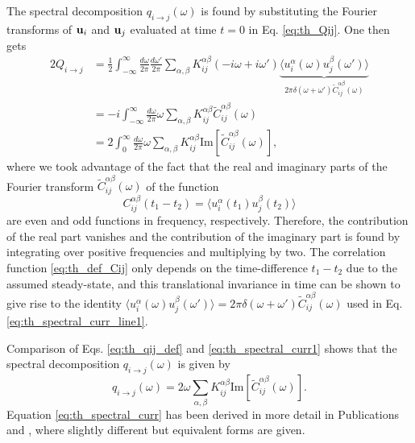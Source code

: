 The spectral decomposition $q_{i\to j}(\omega)$ is found by substituting the Fourier transforms of $\mathbf{u}_i$ and $\mathbf{u}_j$ evaluated at time $t=0$ in Eq. \eqref{eq:th_Qij}. One then gets
\begin{alignat}{2}
 Q_{i\to j} &= \frac{1}{2} \int_{-\infty}^{\infty} \frac{d\omega}{2\pi} \frac{d\omega'}{2\pi} \sum_{\alpha,\beta} K_{ij}^{\alpha\beta} (-i\omega+i\omega') \underbrace{\langle u_i^{\alpha}(\omega) u_j^{\beta}(\omega') \rangle}_{2\pi \delta(\omega+\omega')\tilde C_{ij}^{\alpha\beta}(\omega)} \label{eq:th_spectral_curr_line1} \\
  &= -i   \int_{-\infty}^{\infty} \frac{d\omega}{2\pi} \omega \sum_{\alpha,\beta} K_{ij}^{\alpha\beta} \tilde C_{ij}^{\alpha\beta}(\omega) \label{eq:th_spectral_curr_line2} \\
  &=  2 \int_{0}^{\infty}\frac{d\omega}{2\pi} \omega \sum_{\alpha,\beta} K_{ij}^{\alpha\beta} \textrm{Im}[\tilde C_{ij}^{\alpha\beta}(\omega)], \label{eq:th_spectral_curr1}
\end{alignat}
where we took advantage of the fact that the real and imaginary parts of the Fourier transform $\tilde{C}_{ij}^{\alpha\beta}(\omega)$ of the function
\begin{equation}
 C_{ij}^{\alpha\beta}(t_1-t_2) = \langle u_i^{\alpha}(t_1)u_j^{\beta}(t_2) \rangle \label{eq:th_def_Cij} 
\end{equation}
are even and odd functions in frequency, respectively. Therefore, the contribution of the real part vanishes and the contribution of the imaginary part is found by integrating over positive frequencies and multiplying by two. The correlation function \eqref{eq:th_def_Cij} only depends on the time-difference $t_1-t_2$ due to the assumed steady-state, and this translational invariance in time can be shown to give rise to the identity $\langle u_i^{\alpha}(\omega) u_j^{\beta}(\omega') \rangle = 2\pi \delta(\omega+\omega')\tilde C_{ij}^{\alpha\beta}(\omega)$ used in Eq. \eqref{eq:th_spectral_curr_line1}. 

Comparison of Eqs. \eqref{eq:th_qij_def} and \eqref{eq:th_spectral_curr1} shows that the spectral decomposition $q_{i\to j}(\omega)$ is given by 
\begin{equation}
 q_{i\to j}(\omega) = 2  \omega \sum_{\alpha,\beta} K_{ij}^{\alpha\beta} \textrm{Im}[\tilde C_{ij}^{\alpha\beta}(\omega)]. \label{eq:th_spectral_curr}
\end{equation}
Equation \eqref{eq:th_spectral_curr} has been derived in more detail in Publications  and , where slightly different but equivalent forms are given. 

